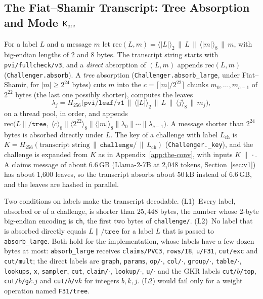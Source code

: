 \subsection{The Fiat--Shamir Transcript: Tree Absorption and Mode \texorpdfstring{$\mathsf{K}_{\mathrm{pre}}$}{Kpre}}
\label{app:fstree}

 For a label $L$ and a message $m$ let
$\mathrm{rec}(L,m)=\langle|L|\rangle_2\,\|\,L\,\|\,\langle|m|\rangle_8\,\|\,m$, with big-endian
lengths of 2 and 8 bytes. The transcript string starts with \texttt{pvi/fullcheck/v3}, and a
\emph{direct} absorption of $(L,m)$ appends $\mathrm{rec}(L,m)$ (\texttt{Challenger.absorb}). A
\emph{tree} absorption (\texttt{Challenger.absorb\_large}, under Fiat--Shamir, for
$|m|\ge2^{24}$ bytes) cuts $m$ into the $c=\lceil|m|/2^{22}\rceil$ chunks $m_0,\dots,m_{c-1}$ of
$2^{22}$ bytes (the last one possibly shorter), computes the leaves
\[
  \lambda_j=H_{256}\big(\texttt{pvi/leaf/v1}\,\|\,\langle|L|\rangle_2\,\|\,L\,\|\,\langle j\rangle_8
  \,\|\,m_j\big),
\]
on a thread pool, in order, and appends
$\mathrm{rec}\big(L\|\texttt{/tree},\ \langle c\rangle_8\|\langle2^{22}\rangle_8\|\langle|m|\rangle_8
\|\lambda_0\|\cdots\|\lambda_{c-1}\big)$. A message shorter than $2^{24}$ bytes is absorbed directly
under $L$. The key of a challenge with label $L_{\mathrm{ch}}$ is
$K=H_{256}(\text{transcript string}\,\|\,\texttt{challenge/}\,\|\,L_{\mathrm{ch}})$
(\texttt{Challenger.\_key}), and the challenge is expanded from $K$ as in
Appendix~\ref{app:the-conv}, with inputs $K\,\|\,\cdot$. A claims message of about 6.6\,GB
(Llama-2-7B at 2{,}048 tokens, Section~\ref{sec:v1}) has about 1{,}600 leaves, so the transcript
absorbs about 50\,kB instead of 6.6\,GB, and the leaves are hashed in parallel.

 Two conditions on labels make the transcript decodable.
(L1)~Every label, absorbed or of a challenge, is shorter than $25{,}448$ bytes, the number whose
2-byte big-endian encoding is \texttt{ch}, the first two bytes of \texttt{challenge/}.
(L2)~No label that is absorbed directly equals $L\|\texttt{/tree}$ for a label $L$ that is passed to
\texttt{absorb\_large}.
Both hold for the implementation, whose labels have a few dozen bytes at most: \texttt{absorb\_large}
receives \texttt{claims/PVC3}, \texttt{rows/I8}, \texttt{u/F31}, \texttt{cut/exc} and
\texttt{cut/mult}; the direct labels are \texttt{graph}, \texttt{params}, \texttt{op/}$\cdot$,
\texttt{col/}$\cdot$, \texttt{group/}$\cdot$, \texttt{table/}$\cdot$, \texttt{lookups}, \texttt{x},
\texttt{sampler}, \texttt{cut}, \texttt{claim/}$\cdot$, \texttt{lookup/}$\cdot$, \texttt{u/}$\cdot$
and the GKR labels \texttt{cut/}$b$\texttt{/top}, \texttt{cut/}$b$\texttt{/g}$k.j$ and
\texttt{cut/}$b$\texttt{/v}$k$ for integers $b,k,j$. (L2) would fail only for a weight operation
named \texttt{F31/tree}.

